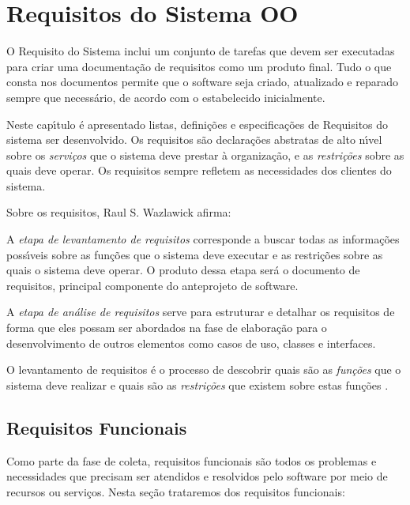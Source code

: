 
\chapter{Requisitos do Sistema OO}

O Requisito do Sistema inclui um conjunto de tarefas que devem ser executadas para criar uma documentação de requisitos como um produto final. Tudo o que consta nos documentos permite que o software seja criado, atualizado e reparado sempre que necessário, de acordo com o estabelecido inicialmente.



Neste cap\'{\i}tulo \'{e} apresentado listas, defini\c{c}\~{o}es e especifica\c{c}\~{o}es de Requisitos do sistema ser desenvolvido. Os requisitos s\~{a}o declara\c{c}\~{o}es abstratas de alto n\'{\i}vel sobre os \textit{servi\c{c}os} que o sistema deve prestar \`{a} organiza\c{c}\~{a}o, e as \textit{restri\c{c}\~{o}es} sobre as quais deve operar. Os requisitos sempre refletem as necessidades dos clientes do sistema.

Sobre os requisitos,  Raul S. Wazlawick afirma:
\begin{citadireta}
  A \textit{etapa de levantamento de requisitos} corresponde a buscar todas as informa\c{c}\~{o}es poss\'{\i}veis sobre as fun\c{c}\~{o}es que o sistema deve executar e as restri\c{c}\~{o}es sobre as quais o sistema deve operar. O produto dessa etapa ser\'{a} o documento de requisitos, principal componente do anteprojeto de software.

  A \textit{etapa de an\'{a}lise de requisitos} serve para estruturar e detalhar os requisitos de forma que eles possam ser abordados na fase de elabora\c{c}\~{a}o para o desenvolvimento  de outros elementos como casos de uso, classes e interfaces.

  O levantamento de requisitos \'{e} o processo de descobrir quais s\~{a}o as \textit{fun\c{c}\~{o}es} que o sistema deve realizar e quais s\~{a}o as \textit{restri\c{c}\~{o}es} que existem sobre estas fun\c{c}\~{o}es  \cite{Wazlawick2011}.
\end{citadireta}



\section{ Requisitos Funcionais}
Como parte da fase de coleta, requisitos funcionais são todos os problemas e necessidades que precisam ser atendidos e resolvidos pelo software por meio de recursos ou serviços. Nesta seção trataremos dos requisitos funcionais:

